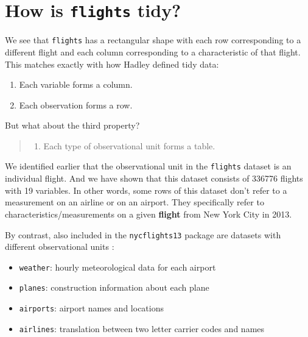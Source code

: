\documentclass[]{tufte-book}
\providecommand{\tightlist}{%
  \setlength{\itemsep}{0pt}\setlength{\parskip}{0pt}}
\begin{document}
\section{\texorpdfstring{How is \texttt{flights}
tidy?}{How is flights tidy?}}\label{how-is-flights-tidy}

We see that \texttt{flights} has a rectangular shape with each row
corresponding to a different flight and each column corresponding to a
characteristic of that flight. This matches exactly with how Hadley
defined tidy data:

\begin{enumerate}
\def\labelenumi{\arabic{enumi}.}
\tightlist
\item
  Each variable forms a column.
\item
  Each observation forms a row.
\end{enumerate}

But what about the third property?

\begin{quote}
\begin{enumerate}
\def\labelenumi{\arabic{enumi}.}
\setcounter{enumi}{2}
\tightlist
\item
  Each type of observational unit forms a table.
\end{enumerate}
\end{quote}

We identified earlier that the observational unit in the
\texttt{flights} dataset is an individual flight. And we have shown that
this dataset consists of 336776 flights with 19 variables. In other
words, some rows of this dataset don't refer to a measurement on an
airline or on an airport. They specifically refer to
characteristics/measurements on a given \textbf{flight} from New York
City in 2013.

By contrast, also included in the \texttt{nycflights13} package are
datasets with different observational units \citep{R-nycflights13}:

\begin{itemize}
\tightlist
\item
  \texttt{weather}: hourly meteorological data for each airport
\item
  \texttt{planes}: construction information about each plane
\item
  \texttt{airports}: airport names and locations
\item
  \texttt{airlines}: translation between two letter carrier codes and
  names
\end{itemize}
\end{document}
